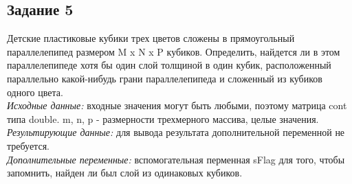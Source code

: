 \documentclass[a4paper,14pt]{extarticle}
\begin{document}
\subsection{Задание 5}
Детские пластиковые кубики трех цветов сложены в прямоугольный параллелепипед размером M x N x P кубиков. Определить, найдется ли в этом параллелепипеде хотя бы один слой толщиной в один кубик, расположенный параллельно какой-нибудь грани параллелепипеда и сложенный из кубиков одного цвета.\\
\textit{Исходные данные:} входные значения могут быть любыми, поэтому матрица cont типа double. m, n, p - размерности трехмерного массива, целые значения.\\
\textit{Результирующие данные:} для вывода результата дополнительной переменной не требуется.\\
\textit{Дополнительные переменные:} вспомогательная перменная sFlag для того, чтобы запомнить, найден ли был слой из одинаковых кубиков.\\
\end{document}
